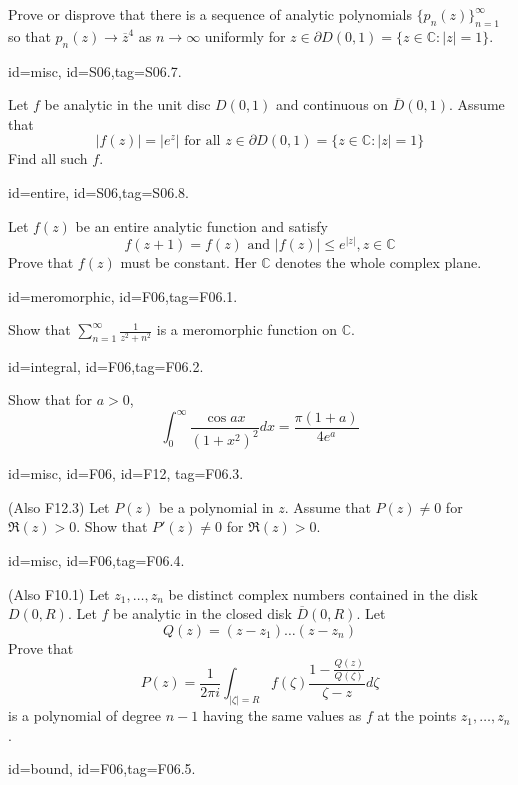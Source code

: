 \documentclass[12pt,letterpaper]{article}
\begin{document}
{Prove or disprove that there is a sequence of analytic polynomials $\{p_n(z)\}_{n=1}^{\infty}$ so that $p_n(z) \rightarrow \overline{z}^4$ as $n\rightarrow \infty$ uniformly for $z \in \partial D(0,1) = \{z \in \mathbb{C} \colon | z | = 1\}$.

\item[id=misc, id=S06,tag=S06.7.]

Let $f$ be analytic in the unit disc $D(0,1)$ and continuous on $\overline{D}(0,1)$. Assume that
\[
	| f(z) | = | e^z | \text{ for all } z \in \partial D(0,1) = \{z \in \mathbb{C} \colon | z | = 1\}
\]
Find all such $f$.

\item[id=entire, id=S06,tag=S06.8.]

Let $f(z)$ be an entire analytic function and satisfy
\[
	f(z+1) = f(z) \text{ and } | f(z) | \le e^{| z |}, z \in \mathbb{C}
\]
Prove that $f(z)$ must be constant. Her $\mathbb{C}$ denotes the whole complex plane.



\item[id=meromorphic, id=F06,tag=F06.1.]

Show that $\sum_{n=1}^{\infty} \frac{1}{z^2 + n^2}$ is a meromorphic function on $\mathbb{C}$.

\item[id=integral, id=F06,tag=F06.2.]

Show that for $a > 0$,
\[
	\int_{0}^{\infty} \frac{\cos ax}{(1+x^2)^2} dx = \frac{\pi(1+a)}{4e^a}
\]

\item[id=misc, id=F06, id=F12, tag=F06.3.]

(Also F12.3) Let $P(z)$ be a polynomial in $z$. Assume that $P(z) \ne 0$ for $\Re(z) > 0$. Show that $P'(z) \ne 0$ for $\Re(z) > 0$.

\item[id=misc, id=F06,tag=F06.4.]

(Also F10.1) Let $z_1,\ldots, z_n$ be distinct complex numbers contained in the disk $D(0,R)$. Let $f$ be analytic in the closed disk $\overline{D}(0,R)$. Let
\[
	Q(z) = (z - z_1)\ldots (z - z_n)
\]
Prove that
\[
	P(z) = \frac{1}{2 \pi i} \int_{| \zeta | = R} f(\zeta) \frac{1 - \frac{Q(z)}{Q(\zeta)}}{\zeta - z} d\zeta
\]
is a polynomial of degree $n - 1$ having the same values as $f$ at the points $z_1,\ldots, z_n$.

\item[id=bound, id=F06,tag=F06.5.]

}
\end{document}
